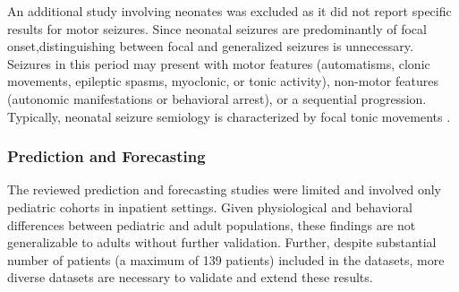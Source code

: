 An additional study \cite{Chen2023-ns} involving neonates was excluded as it did not report specific results for motor seizures. Since neonatal seizures are predominantly of focal onset,distinguishing between focal and generalized seizures is unnecessary. Seizures in this period may present with motor features (automatisms, clonic movements, epileptic spasms, myoclonic, or tonic activity), non-motor features (autonomic manifestations or behavioral arrest), or a sequential progression. Typically, neonatal seizure semiology is characterized by focal tonic movements \cite{Ziobro24-neo}.

\subsubsection{Prediction and Forecasting}
The reviewed prediction and forecasting studies were limited and involved only pediatric cohorts in inpatient settings. Given physiological and behavioral differences between pediatric and adult populations, these findings are not generalizable to adults without further validation. Further, despite substantial number of patients (a maximum of 139 patients) included in the datasets, more diverse datasets are necessary to validate and extend these results.